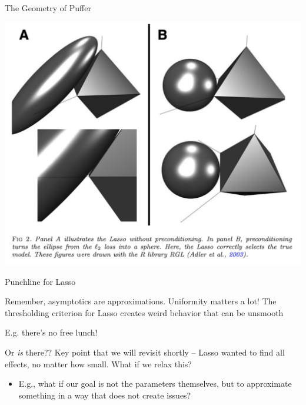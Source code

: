 \documentclass[notes,11pt, aspectratio=169]{beamer}
\newenvironment{wideitemize}{\itemize\addtolength{\itemsep}{10pt}}{\enditemize}
\begin{document}
\begin{frame}{The Geometry of Puffer}
\begin{center}
  \includegraphics[width=0.65\linewidth]{puffer.png}
\end{center}
\end{frame}

\begin{frame}{Punchline for Lasso}
  \begin{wideitemize}
  \item Remember, asymptotics are approximations. Uniformity matters a
    lot! The thresholding criterion for Lasso creates weird behavior
    that can be unsmooth
  \item E.g. there's no free lunch!
  \item Or \emph{is} there?? Key point that we will revisit shortly --
    Lasso wanted to find all effects, no matter how small. What if we
    relax this?
    \begin{itemize}
    \item E.g., what if our goal is not the parameters themselves, but
      to approximate something in a way that does not create issues?
    \end{itemize}
  \end{wideitemize}
\end{frame}
\end{document}
